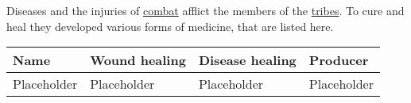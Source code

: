 \section{}\label{ch:Goods:Medicine}

Diseases and the injuries of \hyperref[ch:Conflict:Combat]{combat} afflict the
members of the \hyperref[ch:Tribes]{tribes}. To cure and heal they developed
various forms of medicine, that are listed here.

\begin{longtable}{llll}
	\toprule
	Name        & Wound healing & Disease healing & Producer    \\
	\midrule
	Placeholder & Placeholder   & Placeholder     & Placeholder \\
	\bottomrule
\end{longtable}
